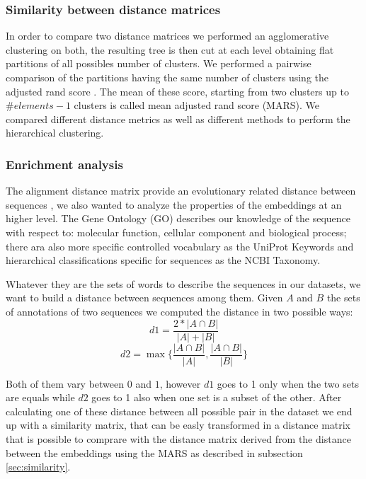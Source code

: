 \documentclass[12pt, letterpaper, twocolumn]{article}
\begin{document}
\subsubsection{Similarity between distance matrices \label{sec:similarity}}
In order to compare two distance matrices we performed an agglomerative clustering on both, the resulting tree is then cut at each level obtaining flat partitions of all possibles number of clusters. We performed a pairwise comparison of the partitions having the same number of clusters using the adjusted rand score \cite{hubert1985comparing}. The mean of these score, starting from two clusters up to $ \#elements - 1 $ clusters is called mean adjusted rand score (MARS). We compared different distance metrics as well as different methods to perform the hierarchical clustering.  

\subsubsection{Enrichment analysis}
The alignment distance matrix provide an evolutionary related distance between sequences \cite{SOFI202247}, we also wanted to analyze the properties of the embeddings at an higher level. The Gene Ontology (GO) describes our knowledge of the sequence with respect to: molecular function, cellular component and biological process; there ara also more specific controlled vocabulary as the UniProt Keywords and hierarchical classifications specific for sequences as the NCBI Taxonomy.

Whatever they are the sets of words to describe the sequences in our datasets, we want to build a distance between sequences among them. Given $A$ and $B$ the sets of annotations of two sequences we computed the distance in two possible ways: $$d1 = \frac{2 * |A \cap B|}{|A| + |B|} $$ $$d2 = \max\{ \frac{|A \cap B|}{|A|}, \frac{|A \cap B|}{|B|} \} $$

Both of them vary between $0$ and $1$, however $d1$ goes to 1 only when the two sets are equals while $d2$ goes to 1 also when one set is a subset of the other. After calculating one of these distance between all possible pair in the dataset we end up with a similarity matrix, that can be easly transformed in a distance matrix that is possible to comprare with the distance matrix derived from the distance between the embeddings using the MARS as described in subsection \ref{sec:similarity}.
\end{document}
